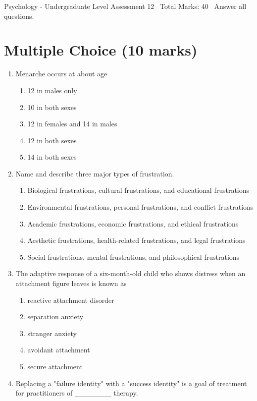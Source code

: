 \documentclass[12pt]{article}
\begin{document}
\begin{center}
Psychology - Undergraduate Level Assessment 12 \
Total Marks: 40 \
Answer all questions.
\end{center}

\section*{Multiple Choice (10 marks)}
\begin{enumerate}[label=\arabic*.]
\item Menarche occurs at about age
\begin{enumerate}[label=(\alph*)]
    \item 12 in males only
    \item 10 in both sexes
    \item 12 in females and 14 in males
    \item 12 in both sexes
    \item 14 in both sexes
\end{enumerate}
\item Name and describe three major types of frustration.
\begin{enumerate}[label=(\alph*)]
    \item Biological frustrations, cultural frustrations, and educational frustrations
    \item Environmental frustrations, personal frustrations, and conflict frustrations
    \item Academic frustrations, economic frustrations, and ethical frustrations
    \item Aesthetic frustrations, health-related frustrations, and legal frustrations
    \item Social frustrations, mental frustrations, and philosophical frustrations
\end{enumerate}
\item The adaptive response of a six-month-old child who shows distress when an attachment figure leaves is known as
\begin{enumerate}[label=(\alph*)]
    \item reactive attachment disorder
    \item separation anxiety
    \item stranger anxiety
    \item avoidant attachment
    \item secure attachment
\end{enumerate}
\item Replacing a "failure identity" with a "success identity" is a goal of treatment for practitioners of \_\_\_\_\_\_\_ therapy.

\end{enumerate}
\end{document}
